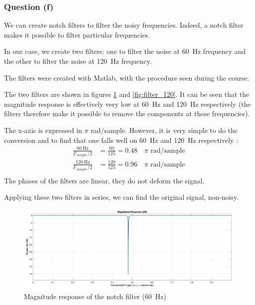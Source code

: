 \documentclass[a4paper, 12pt]{article}
\begin{document}
	\subsubsection*{Question (f)}
	We can create notch filters to filter the noisy frequencies. Indeed, a notch filter makes it possible to filter particular frequencies.\par
	In our case, we create two filters: one to filter the noise at \SI{60}{\hertz} frequency and the other to filter the noise at \SI{120}{\hertz} frequency.\par
	The filters were created with Matlab, with the procedure seen during the course.\par
	The two filters are shown in figures \ref{fig:filter_60} and \ref{fig:filter_120}. It can be seen that the magnitude response is effectively very low at \SI{60}{\hertz} and \SI{120}{\hertz} respectively (the filters therefore make it possible to remove the components at these frequencies).\par
	The x-axis is expressed in $\pi$ rad/sample. However, it is very simple to do the conversion and to find that one falls well on \SI{60}{\hertz} and \SI{120}{\hertz} respectively :
	\begin{align*}
	    \frac{\SI{60}{\hertz}}{F_{sample}/2} &= \frac{60}{125} = \num{0.48}\quad\pi\text{ rad/sample}\\
	    \frac{\SI{120}{\hertz}}{F_{sample}/2} &= \frac{120}{125} = \num{0.96}\quad\pi\text{ rad/sample}\\ 
	\end{align*}
	The phases of the filters are linear, they do not deform the signal.\par
	Applying these two filters in series, we can find the original signal, non-noisy.
	\begin{figure}[H]
	    \centering
	    \includegraphics[width=1\textwidth]{resources/pdf/filter_60.pdf}
	    \caption{Magnitude response of the notch filter (\SI{60}{\hertz})}
	    \label{fig:filter_60}
	\end{figure}
\end{document}
